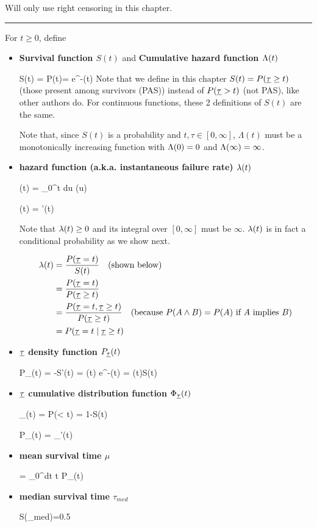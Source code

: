Will only use right censoring in this chapter.
\hrule
For $t\geq 0$, define
\begin{itemize}
\item {\bf Survival function $S(t)$}
and {\bf Cumulative hazard function $\Lambda(t)$}

\beq
S(t) = P(\rvtau \geq t)= e^{-\Lam(t)}
\eeq
Note that we define in this chapter
 $S(t) = P(\rvtau\geq t)$ (those present among survivors (PAS))
instead of $P(\rvtau > t)$ (not PAS), like other authors do. For
continuous functions,
these 2 definitions of $S(t)$
are the same.

Note that,
since $S(t)$
is a probability and $t, \tau \in [0, \infty]$,
$\Lambda(t)$ must be a monotonically increasing function with
$\Lambda(0)=0$ and $\Lambda(\infty) = \infty$.

\item {\bf hazard function
(a.k.a.  instantaneous failure rate) $\lambda(t)$}

\beq
\Lam(t) = \int_0^t  du\; \lam(u)
\eeq

\beq
\lam(t) = \Lam'(t)
\eeq

Note that $\lambda(t)\geq 0$
and its integral over $[0,\infty]$
must be $\infty$.
$\lambda(t)$ is in fact a conditional probability
as we show next.

\begin{align}
\lam(t) &=
\frac{P(\rvtau=t)}{S(t)} \quad \text{(shown below)}
\\
&=
\frac{P(\rvtau=t)}{P(\rvtau\geq t)}
\\
&=
\frac{P(\rvtau=t, \rvtau\geq t)}{P(\rvtau\geq t)}
\quad\text{(because $P(A \A B) = P(A)$ if $A$ implies $B$)}
\\
&=
P(\rvtau=t\mid \rvtau\geq t)
\end{align}


\item {\bf $\rvtau$ density function $P_\rvtau(t)$}

\beq
P_\rvtau(t) = -S'(t) = \lam(t) e^{-\Lam(t)} =
\lam(t)S(t)
\eeq

\item {\bf $\rvtau$ cumulative distribution function
$\Phi_\rvtau(t)$}

\beq
\Phi_\rvtau(t) = P(\rvtau< t) = 1-S(t)
\eeq

\beq
P_\rvtau(t) = \Phi_\rvtau'(t)
\eeq

\item {\bf mean survival time $\mu$}

\beq
\mu= \int_0^\infty dt\; t P_\rvtau(t)
\eeq

\item {\bf median survival time $\tau_{med}$}

\beq
S(\tau_{med})=0.5
\eeq

\end{itemize}

